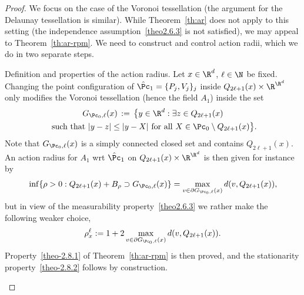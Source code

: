 \begin{proof}
We focus on the case of the Voronoi tessellation (the argument for the Delaunay tessellation is similar). While Theorem~\ref{th:ar} does not apply to this setting (the independence assumption~\eqref{theo2.6.3} is not satisfied), we may appeal to Theorem~\ref{th:ar-rpm}. We need to construct and control action radii, which we do in two separate steps.
\setcounter{stepcount}{0}
\begin{step}{Definition and properties of the action radius.}
\label{step1proofprop3.2}
\noindent Let $x\in\R^d$, $\ell \in \N$ be fixed. Changing the point configuration of $\hat\Pc_1=\{P_j,V_j\}_j$ inside $Q_{2\ell+1}(x)\times\R^{\R^d}$ only modifies the Voronoi tessellation (hence the field $A_1$) inside the set
\begin{multline*}
G_{\Pc_0,\ell}(x)\,:=\,\big\{y\in\R^d:\exists z\in Q_{2\ell+1}(x)\\\text{ such that }|y-z|\le|y-X|\text{ for all } X\in \Pc_0\setminus Q_{2\ell+1}(x)\big\}.
\end{multline*}
Note that $G_{\Pc_0,\ell}(x)$ is a simply connected closed set and contains $Q_{2\ell+1}(x)$. An action radius for $A_1$ wrt $\hat\Pc_1$ on $Q_{2\ell+1}(x)\times\R^{\R^d}$ is then given for instance by
\[
\inf\{\rho>0:Q_{2\ell+1}(x)+B_\rho\supset G_{\Pc_0,\ell}(x)\}=\max_{v\in \partial G_{\Pc_0,\ell}(x)}d(v,Q_{2\ell+1}(x)),
\]
but in view of the measurability property~\eqref{theo2.6.3} we rather make the following weaker choice,
\[
\rho_{x}^{\ell}:= 1+2\max_{v\in \partial G_{\Pc_0,\ell}(x)}d(v,Q_{2\ell+1}(x)).
\]
Property~\eqref{theo-2.8.1} of Theorem~\ref{th:ar-rpm} is then proved, and the stationarity property~\eqref{theo-2.8.2} follows by construction.


\end{step}
\end{proof}
